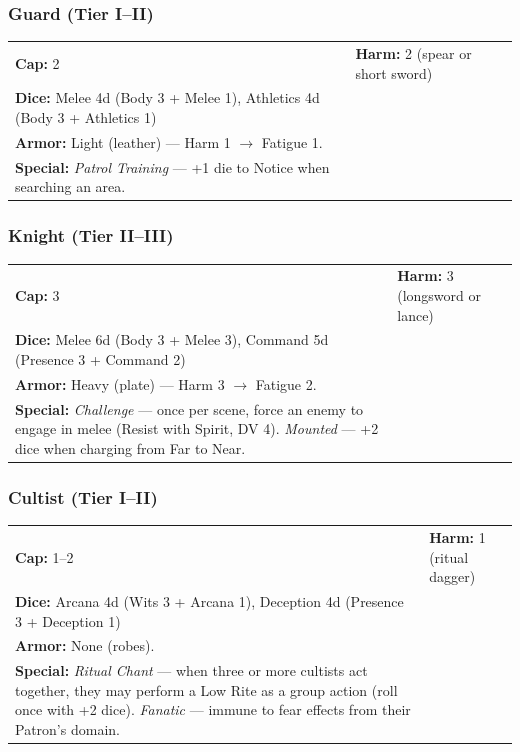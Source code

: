 \subsubsection{Guard (Tier I--II)}
\vspace{0.2em}
\begin{tabular}{@{}ll@{}}
\textbf{Cap:} 2 & \textbf{Harm:} 2 (spear or short sword) \\
\textbf{Dice:} Melee 4d (Body 3 + Melee 1), Athletics 4d (Body 3 + Athletics 1) \\
\textbf{Armor:} Light (leather) --- Harm 1 $\rightarrow$ Fatigue 1. \\
\textbf{Special:} \textit{Patrol Training} --- +1 die to Notice when searching an area.
\end{tabular}

\subsubsection{Knight (Tier II--III)}
\vspace{0.2em}
\begin{tabular}{@{}ll@{}}
\textbf{Cap:} 3 & \textbf{Harm:} 3 (longsword or lance) \\
\textbf{Dice:} Melee 6d (Body 3 + Melee 3), Command 5d (Presence 3 + Command 2) \\
\textbf{Armor:} Heavy (plate) --- Harm 3 $\rightarrow$ Fatigue 2. \\
\textbf{Special:} \textit{Challenge} --- once per scene, force an enemy to engage in melee (Resist with Spirit, DV 4). \textit{Mounted} --- +2 dice when charging from Far to Near.
\end{tabular}

\subsubsection{Cultist (Tier I--II)}
\vspace{0.2em}
\begin{tabular}{@{}ll@{}}
\textbf{Cap:} 1--2 & \textbf{Harm:} 1 (ritual dagger) \\
\textbf{Dice:} Arcana 4d (Wits 3 + Arcana 1), Deception 4d (Presence 3 + Deception 1) \\
\textbf{Armor:} None (robes). \\
\textbf{Special:} \textit{Ritual Chant} --- when three or more cultists act together, they may perform a Low Rite as a group action (roll once with +2 dice). \textit{Fanatic} --- immune to fear effects from their Patron's domain.
\end{tabular}

